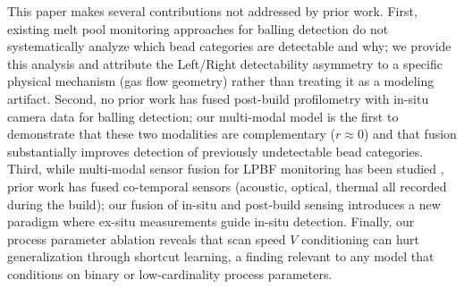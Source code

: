 This paper makes several contributions not addressed by
prior work. First, existing melt pool monitoring approaches
for balling detection \citep{scime2018using, cao2023monitoring}
do not systematically analyze which bead categories are
detectable and why; we provide this analysis and attribute
the Left/Right detectability asymmetry to a specific physical
mechanism (gas flow geometry) rather than treating it as
a modeling artifact. Second, no prior work has fused
post-build profilometry with in-situ camera data for
balling detection; our multi-modal model is the first to
demonstrate that these two modalities are complementary
($r \approx 0$) and that fusion substantially improves
detection of previously undetectable bead categories.
Third, while multi-modal sensor fusion for LPBF monitoring
has been studied \citep{petrich2021multimodal,gaikwad2022multi},
prior work has fused co-temporal sensors (acoustic, optical,
thermal all recorded during the build); our fusion of
in-situ and post-build sensing introduces a new paradigm
where ex-situ measurements guide in-situ detection.
Finally, our process parameter ablation reveals that scan
speed $V$ conditioning can hurt generalization through
shortcut learning, a finding relevant to any model that
conditions on binary or low-cardinality process parameters.

